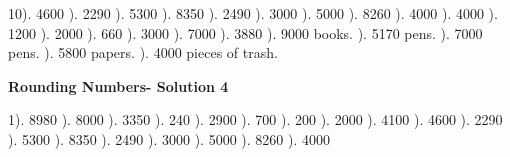 \documentclass{article}%
\begin{document}
10). 4600%
). 2290%
). 5300%
). 8350%
). 2490%
). 3000%
). 5000%
). 8260%
). 4000%
). 4000%
). 1200%
). 2000%
). 660%
). 3000%
). 7000%
). 3880%
). 9000 books.%
). 5170 pens.%
). 7000 pens.%
). 5800 papers.%
). 4000 pieces of trash.%
\newline%
\newpage%
\large%
\begin{center}%
\textbf{Rounding Numbers- Solution 4}%
\newline%
\end{center} \normalsize%
1). 8980%
). 8000%
). 3350%
). 240%
). 2900%
). 700%
). 200%
). 2000%
). 4100%
). 4600%
). 2290%
). 5300%
). 8350%
). 2490%
). 3000%
). 5000%
). 8260%
). 4000%
\newline%
\end{document}
